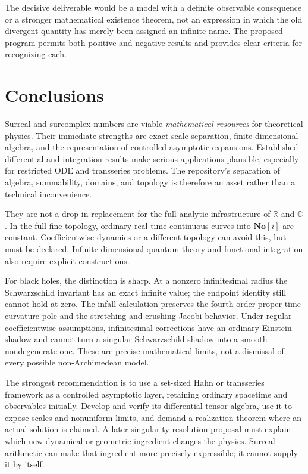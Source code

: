 \documentclass[11pt,a4paper]{article}
\numberwithin{equation}{section}
\theoremstyle{definition}
\theoremstyle{remark}
\newcommand{\No}{\mathbf{No}}
\newcommand{\R}{\mathbb R}
\newcommand{\C}{\mathbb C}
\begin{document}
The decisive deliverable would be a model with a definite observable consequence or a stronger mathematical existence theorem, not an expression in which the old divergent quantity has merely been assigned an infinite name. The proposed program permits both positive and negative results and provides clear criteria for recognizing each.

\section{Conclusions}
\label{sec:conclusions}

Surreal and surcomplex numbers are viable \emph{mathematical resources} for theoretical physics. Their immediate strengths are exact scale separation, finite-dimensional algebra, and the representation of controlled asymptotic expansions. Established differential and integration results make serious applications plausible, especially for restricted ODE and transseries problems. The repository's separation of algebra, summability, domains, and topology is therefore an asset rather than a technical inconvenience.

They are not a drop-in replacement for the full analytic infrastructure of $\R$ and $\C$. In the full fine topology, ordinary real-time continuous curves into $\No[i]$ are constant. Coefficientwise dynamics or a different topology can avoid this, but must be declared. Infinite-dimensional quantum theory and functional integration also require explicit constructions.

For black holes, the distinction is sharp. At a nonzero infinitesimal radius the Schwarzschild invariant has an exact infinite value; the endpoint identity still cannot hold at zero. The infall calculation preserves the fourth-order proper-time curvature pole and the stretching-and-crushing Jacobi behavior. Under regular coefficientwise assumptions, infinitesimal corrections have an ordinary Einstein shadow and cannot turn a singular Schwarzschild shadow into a smooth nondegenerate one. These are precise mathematical limits, not a dismissal of every possible non-Archimedean model.

The strongest recommendation is to use a set-sized Hahn or transseries framework as a controlled asymptotic layer, retaining ordinary spacetime and observables initially. Develop and verify its differential tensor algebra, use it to expose scales and nonuniform limits, and demand a realization theorem where an actual solution is claimed. A later singularity-resolution proposal must explain which new dynamical or geometric ingredient changes the physics. Surreal arithmetic can make that ingredient more precisely expressible; it cannot supply it by itself.
\end{document}
